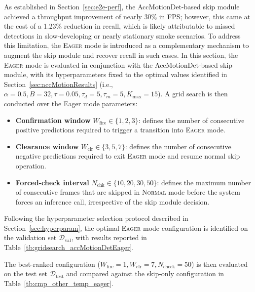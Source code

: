 \documentclass[final,3p,times,twocolumn]{elsarticle}
\begin{document}
As established in Section~\ref{sec:e2e-perf}, the AccMotionDet-based
skip module achieved a throughput improvement of nearly 30\% in FPS;
however, this came at the cost of a 1.23\% reduction in recall, which
is likely attributable to missed detections in slow-developing or
nearly stationary smoke scenarios. To address this limitation, the
\textsc{Eager} mode is introduced as a complementary mechanism to
augment the skip module and recover recall in such cases. In this
section, the \textsc{Eager} mode is evaluated in conjunction with the
AccMotionDet-based skip module, with its hyperparameters fixed to the
optimal values identified in Section~\ref{sec:accMotionResults} (i.e.,
$\alpha{=}0.5,B{=}32,\tau{=}0.05,\tau_d{=}5,\tau_m{=}5,K_{\max}{=}15$).
A grid search is then conducted over the Eager mode parameters:

\begin{itemize}
\item \textbf{Confirmation window} $W_{\mathrm{fire}} \in \{1, 2, 3\}$:
defines the number of consecutive positive predictions required to
trigger a transition into \textsc{Eager} mode.
\item \textbf{Clearance window} $W_{\mathrm{clr}} \in \{3, 5, 7\}$:
defines the number of consecutive negative predictions required to
exit \textsc{Eager} mode and resume normal skip operation.
\item \textbf{Forced-check interval} $N_{\mathrm{chk}} \in \{10, 20,
30, 50\}$: defines the maximum number of consecutive frames that are
skipped in \textsc{Normal} mode before the system forces an inference
call, irrespective of the skip module decision.
\end{itemize}

Following the hyperparameter selection protocol described in
Section~\ref{sec:hyperparam}, the optimal \textsc{Eager} mode
configuration is identified on the validation set
$\mathcal{D}_{\mathrm{val}}$, with results reported in
Table~\ref{tb:gridsearch_accMotionDetEager}.

The best-ranked configuration ($W_{\text{fire}} = 1, W_{\text{clr}} =
7, N_{\text{check}} = 50$) is then evaluated on the test set
$\mathcal{D}_{\text{test}}$ and compared against the skip-only
configuration in Table~\ref{tb:cmp_other_temp_eager}.

\begin{table}[t]
\caption{Comparison of frame-level performance metrics, measuring the
delay and initial detection speed. The best and second-best results
for each metric are highlighted in \textbf{bold} and
\textit{\underline{italic underline}}, respectively.}
\label{tb:cmp_other_temp_eager}
\end{table}
\end{document}
